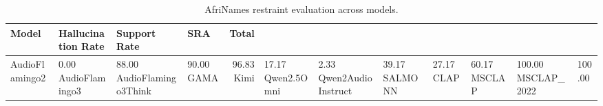 \begin{table}
\caption{AfriNames restraint evaluation across models.}
\label{tab:afrinames_restraint}
\begin{tabular}{llllr}
\toprule
Model & Hallucination Rate & Support Rate & SRA & Total \\
\midrule
AudioFlamingo2 & 0.00%
AudioFlamingo3 & 88.00%
AudioFlamingo3Think & 90.00%
GAMA & 96.83%
Kimi & 17.17%
Qwen2.5Omni & 2.33%
Qwen2AudioInstruct & 39.17%
SALMONN & 27.17%
CLAP & 60.17%
MSCLAP & 100.00%
MSCLAP_2022 & 100.00%
\bottomrule
\end{tabular}
\end{table}
